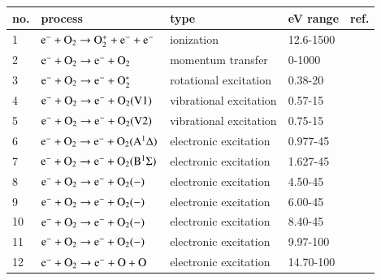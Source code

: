 \begin{table}
  \center{}
  \begin{threeparttable}
    \label{tab:tableO2}
    \begin{tabular*}{\textwidth}{l@{\extracolsep{\fill}}llll}
    \toprule
    {no.}  & {process} & {type} &  {eV range}  &  {ref.} \\
    \midrule
      1 & $\rm e^- + O_2 \rightarrow O_2^+ + e^- + e^-$  &  ionization   &  12.6-1500 &   \cite{lxc:2024:morgan} \\ 
      \midrule     
      2 & $\rm e^- + O_2 \rightarrow e^- + O_2$  &  momentum transfer   &  0-1000  & \cite{lxc:2024:morgan}\\   
      \midrule
      3 & $\rm e^- + O_2 \rightarrow e^- + O_2^* $  &  rotational excitation   &  0.38-20 & \cite{lxc:2024:morgan}\\ 
           \midrule
      4 & $\rm e^- + O_2 \rightarrow e^- + O_2(V1)$  &  vibrational excitation   &  0.57-15 &\cite{lxc:2024:morgan}\\  
      5 & $\rm e^- + O_2 \rightarrow e^- + O_2(V2)$  &  vibrational excitation   &  0.75-15 &\cite{lxc:2024:morgan}\\ 
          \midrule
      6 & $\rm e^- + O_2 \rightarrow e^- + O_2(A^1 \Delta) $  &  electronic excitation   &  0.977-45 & \cite{lxc:2024:morgan}\\ 
      7 & $\rm e^- + O_2 \rightarrow e^- + O_2(B^1 \Sigma) $  &  electronic excitation   &  1.627-45 & \cite{lxc:2024:morgan}\\ 
      8 & $\rm e^- + O_2 \rightarrow e^- + O_2(-) $  &  electronic excitation   &  4.50-45 & \cite{lxc:2024:morgan}\\ 
      9 & $\rm e^- + O_2 \rightarrow e^- + O_2(-) $  &  electronic excitation   &  6.00-45 & \cite{lxc:2024:morgan}\\ 
      10 & $\rm e^- + O_2 \rightarrow e^- + O_2(-) $  &  electronic excitation   &  8.40-45 & \cite{lxc:2024:morgan}\\ 
      11 & $\rm e^- + O_2 \rightarrow e^- + O_2(-) $  &  electronic excitation   &  9.97-100 & \cite{lxc:2024:morgan}\\ 
      12 & $\rm e^- + O_2 \rightarrow e^- + O + O $  &  electronic excitation   &  14.70-100 & \cite{lxc:2024:morgan}\\ 
    \bottomrule
    \end{tabular*}

   \end{threeparttable}
\end{table}


